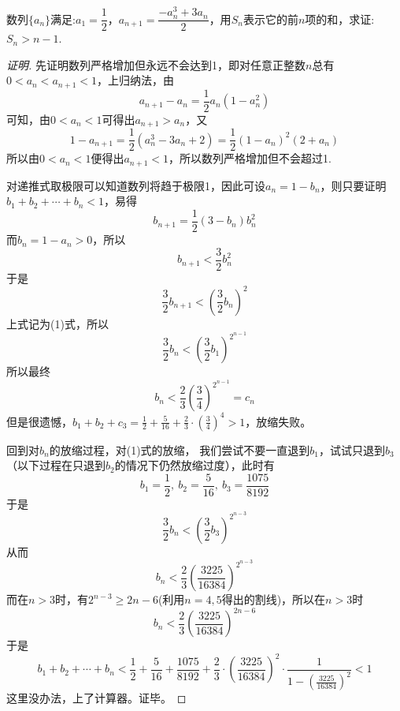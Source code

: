 \begin{exercise}
  数列$\{a_n\}$满足:$a_1=\dfrac{1}{2}$，$a_{n+1}=\dfrac{-a_n^3+3a_n}{2}$，用$S_n$表示它的前$n$项的和，求证: $S_n>n-1$.
\end{exercise}

\exerciseFrom[\url{http://kuing.orzweb.net/viewthread.php?tid=4952}]

\exerciseSolvedDate[2017-10-21]

\begin{proof}[证明]
  先证明数列严格增加但永远不会达到1，即对任意正整数$n$总有$0<a_n<a_{n+1}<1$，上归纳法，由
\[ a_{n+1}-a_n=\frac{1}{2}a_n(1-a_n^2) \]
可知，由$0<a_n<1$可得出$a_{n+1}>a_n$，又
\[ 1-a_{n+1}=\frac{1}{2}(a_n^3-3a_n+2)=\frac{1}{2}(1-a_n)^2(2+a_n) \]
所以由$0<a_n<1$便得出$a_{n+1}<1$，所以数列严格增加但不会超过1.

对递推式取极限可以知道数列将趋于极限1，因此可设$a_n=1-b_n$，则只要证明$b_1+b_2+\cdots+b_n<1$，易得
\[ b_{n+1}=\frac{1}{2}(3-b_n)b_n^2 \]
而$b_n=1-a_n >0$，所以
\[ b_{n+1}<\frac{3}{2}b_n^2 \]
于是
\[ \frac{3}{2}b_{n+1} < \left( \frac{3}{2}b_n \right)^2 \]
上式记为(1)式，所以
\[ \frac{3}{2}b_n < \left( \frac{3}{2}b_1 \right)^{2^{n-1}} \]
所以最终
\[ b_n<\frac{2}{3} \left( \frac{3}{4} \right)^{2^{n-1}} = c_n  \]
但是很遗憾，$b_1+b_2+c_3=\frac{1}{2}+\frac{5}{16}+\frac{2}{3}\cdot\left( \frac{3}{4} \right)^4>1$，放缩失败。

回到对$b_n$的放缩过程，对(1)式的放缩， 我们尝试不要一直退到$b_1$，试试只退到$b_3$（以下过程在只退到$b_2$的情况下仍然放缩过度），此时有
\[ b_1=\frac{1}{2}, \  b_2=\frac{5}{16}, \  b_3=\frac{1075}{8192} \]
于是
\[ \frac{3}{2}b_n < \left( \frac{3}{2}b_3 \right)^{2^{n-3}} \]
从而
\[ b_n<\frac{2}{3} \left( \frac{3225}{16384} \right)^{2^{n-3}}  \]
而在$n>3$时，有$2^{n-3}\geqslant 2n-6$(利用$n=4,5$得出的割线)，所以在$n>3$时
\[ b_n<\frac{2}{3} \left( \frac{3225}{16384} \right)^{2n-6} \] 
于是
\[ b_1+b_2+\cdots+b_n <  \frac{1}{2} + \frac{5}{16} + \frac{1075}{8192} + \frac{2}{3} \cdot \left( \frac{3225}{16384} \right)^2 \cdot \frac{1}{1-\left( \frac{3225}{16384} \right)^2} < 1 \]
这里没办法，上了计算器。证毕。
\end{proof}

